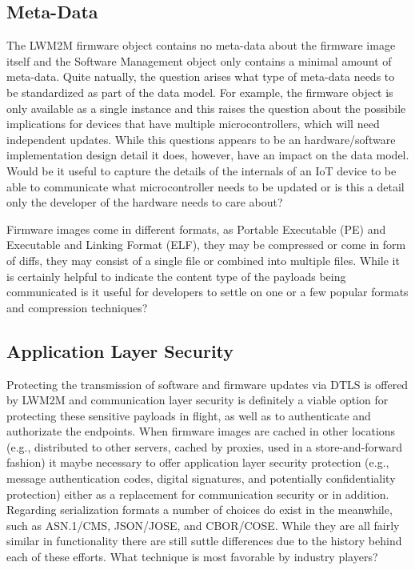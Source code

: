 \documentclass[peerreview, a4paper, 7pt]{IEEEtran}
\begin{document}
\subsection{Meta-Data}

The LWM2M firmware object contains no meta-data about the firmware image itself and the Software Management object only contains a minimal amount of meta-data. Quite natually, the question arises what type of meta-data needs to be standardized as part of the data model. For example, the firmware object is only available as a single instance and this raises the question about the possibile implications for devices that have multiple microcontrollers, which will need independent updates. While this questions appears to be an hardware/software implementation design detail it does, however, have an impact on the data model. Would be it useful to capture the details of the internals of an IoT device to be able to communicate what microcontroller needs to be updated or is this a detail only the developer of the hardware needs to care about? 

Firmware images come in different formats, as Portable Executable (PE) and Executable and Linking Format (ELF), they may be compressed or come in form of diffs, they may consist of a single file or combined into multiple files. While it is certainly helpful to indicate the content type of the payloads being communicated is it useful for developers to settle on one or a few popular formats and compression techniques?

\subsection{Application Layer Security}

Protecting the transmission of software and firmware updates via DTLS is offered by LWM2M and communication layer security is definitely a viable option for protecting these sensitive payloads in flight, as well as to authenticate and authorizate the endpoints. When firmware images are cached in other locations (e.g., distributed to other servers, cached by proxies, used in a store-and-forward fashion) it maybe necessary to offer application layer security protection (e.g., message authentication codes, digital signatures, and potentially confidentiality protection) either as a replacement for communication security or in addition. Regarding serialization formats a number of choices do exist in the meanwhile, such as ASN.1/CMS, JSON/JOSE, and CBOR/COSE. While they are all fairly similar in functionality there are still suttle differences due to the history behind each of these efforts. What technique is most favorable by industry players? 
\end{document}
